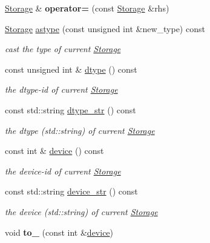 \begin{DoxyCompactItemize}
\hyperlink{classcytnx_1_1Storage}{Storage} \& {\bfseries operator=} (const \hyperlink{classcytnx_1_1Storage}{Storage} \&rhs)
\item 
\hyperlink{classcytnx_1_1Storage}{Storage} \hyperlink{classcytnx_1_1Storage_a8310d8dbb70510272ded2e3d01be25f0}{astype} (const unsigned int \&new\+\_\+type) const
\begin{DoxyCompactList}\small\item\em cast the type of current \hyperlink{classcytnx_1_1Storage}{Storage} \end{DoxyCompactList}\item 
const unsigned int \& \hyperlink{classcytnx_1_1Storage_a643824801e81ab86aca055f1dd1f34d7}{dtype} () const
\begin{DoxyCompactList}\small\item\em the dtype-\/id of current \hyperlink{classcytnx_1_1Storage}{Storage} \end{DoxyCompactList}\item 
const std\+::string \hyperlink{classcytnx_1_1Storage_ab6e9fb01ad4655701a2d54dc978eef17}{dtype\+\_\+str} () const
\begin{DoxyCompactList}\small\item\em the dtype (std\+::string) of current \hyperlink{classcytnx_1_1Storage}{Storage} \end{DoxyCompactList}\item 
const int \& \hyperlink{classcytnx_1_1Storage_a4c3e27582d7f951e6b76ccbb92f7c537}{device} () const
\begin{DoxyCompactList}\small\item\em the device-\/id of current \hyperlink{classcytnx_1_1Storage}{Storage} \end{DoxyCompactList}\item 
const std\+::string \hyperlink{classcytnx_1_1Storage_ae0d90d5275fa7e52a0a2dc10512ba71f}{device\+\_\+str} () const
\begin{DoxyCompactList}\small\item\em the device (std\+::string) of current \hyperlink{classcytnx_1_1Storage}{Storage} \end{DoxyCompactList}\item 
\mbox{\label{classcytnx_1_1Storage_a0bbf2cbefb5d0835bcb4f0d05e400870}} 
void {\bfseries to\+\_\+} (const int \&\hyperlink{classcytnx_1_1Storage_a4c3e27582d7f951e6b76ccbb92f7c537}{device})
\item 
\mbox{\label{classcytnx_1_1Storage_a2abfcaacf807934be5dd21c254fdb30e}} 

\end{DoxyCompactItemize}
